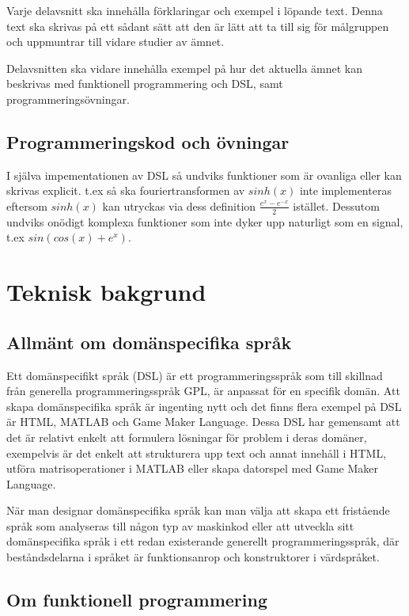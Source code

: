 \documentclass[]{article}
\begin{document}
Varje delavsnitt ska innehålla förklaringar och exempel i löpande text. Denna text ska skrivas på ett sådant sätt att den är lätt att ta till sig för målgruppen och uppmuntrar till vidare studier av ämnet.

Delavsnitten ska vidare innehålla exempel på hur det aktuella ämnet kan beskrivas med funktionell programmering och DSL, samt programmeringsövningar.

\subsection{Programmeringskod och övningar}

I själva impementationen av DSL så undviks funktioner som är
ovanliga eller kan skrivas explicit. t.ex så ska fouriertransformen av
$sinh(x)$ inte implementeras eftersom $sinh(x)$ kan utryckas via dess
definition $\frac{e^{x} - e^{-x}}{2}$ istället.
Dessutom undviks onödigt komplexa funktioner som inte
dyker upp naturligt som en signal, t.ex $sin(cos(x)+e^x)$.

\section{Teknisk bakgrund}

\subsection{Allmänt om domänspecifika språk}
Ett domänspecifikt språk (\gls{DSL}) är ett programmeringsspråk som till
skillnad från generella programmeringsspråk \gls{GPL}, är anpassat för en specifik domän.
Att skapa domänspecifika språk är ingenting nytt och det finns flera exempel på
DSL är HTML, MATLAB och Game Maker Language.
Dessa DSL har gemensamt att det är relativt enkelt att formulera lösningar för
problem i deras domäner, exempelvis är det enkelt att strukturera upp text och
annat innehåll i HTML, utföra matrisoperationer i MATLAB eller skapa datorspel
med Game Maker Language.

När man designar domänspecifika språk kan man välja att skapa ett fristående
språk som analyseras till någon typ av maskinkod eller att utveckla sitt
domänspecifika språk i ett redan existerande generellt programmeringsspråk,
där beståndsdelarna i språket är funktionsanrop och konstruktorer i värdspråket.

\subsection{Om funktionell programmering}
\end{document}
